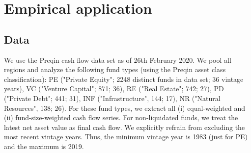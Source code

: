 \documentclass[12pt]{article}
\begin{document}
\begin{table}[ht]
	\centering
	\caption{Comparison to similar estimation frameworks.} 
	\label{tab:comparison}
\end{table}



\section{Empirical application}
\label{sec:empirical_application}

\subsection{Data}

We use the Preqin cash flow data set as of 26th February 2020.
We pool all regions and analyze the following fund types (using the Preqin asset class classification):
PE ("Private Equity"; 2248 distinct funds in data set; 36 vintage years),
VC ("Venture Capital"; 871; 36),
RE ("Real Estate"; 742; 27),
PD ("Private Debt"; 441; 31),
INF ("Infrastructure", 144; 17), 
NR ("Natural Resources", 138; 26).
For these fund types, we extract all (i) equal-weighted and (ii) fund-size-weighted cash flow series.
For non-liquidated funds, we treat the latest net asset value as final cash flow.
We explicitly refrain from excluding the most recent vintage years.
Thus, the minimum vintage year is 1983 (just for PE) and the maximum is 2019.
\end{document}

